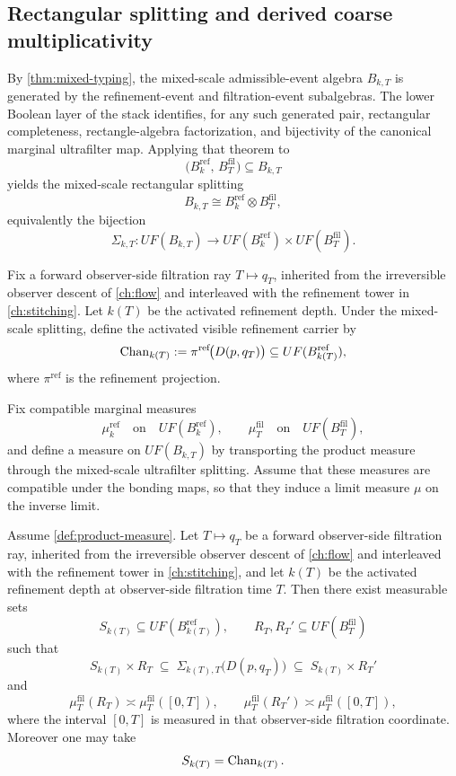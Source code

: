 \subsection{Rectangular splitting and derived coarse multiplicativity}
\label{subsec:derived-coarse}
By \cref{thm:mixed-typing}, the mixed-scale admissible-event algebra
\(B_{k,T}\) is generated by the refinement-event and filtration-event
subalgebras.  The lower Boolean layer of the stack identifies, for any
such generated pair, rectangular completeness, rectangle-algebra
factorization, and bijectivity of the canonical marginal ultrafilter
map.  Applying that theorem to
\[
	\bigl(B_k^{\mathrm{ref}},\,B_T^{\mathrm{fil}}\bigr)\subseteq B_{k,T}
\]
yields the mixed-scale rectangular splitting
\[
	B_{k,T}\cong B_k^{\mathrm{ref}}\otimes B_T^{\mathrm{fil}},
\]
equivalently the bijection
\[
	\Sigma_{k,T}:UF(B_{k,T})
	\longrightarrow
	UF(B_k^{\mathrm{ref}})\times UF(B_T^{\mathrm{fil}}).
\]
\begin{definition}
	Fix a forward observer-side filtration ray \(T\mapsto q_T\),
	inherited from the irreversible observer descent of \cref{ch:flow}
	and interleaved with the refinement tower in
	\cref{ch:stitching}.  Let \(k(T)\) be the activated refinement
	depth.  Under the mixed-scale splitting, define the activated
	visible refinement carrier by
	\[
		\operatorname{Chan}_{k(T)}
		:=
		\pi^{\mathrm{ref}}\!\bigl(D(p,q_T)\bigr)
		\subseteq UF(B_{k(T)}^{\mathrm{ref}}),
	\]
	where \(\pi^{\mathrm{ref}}\) is the refinement projection.
\end{definition}
\begin{definition}
	\label{def:product-measure}
	Fix compatible marginal measures
	\[
		\mu_k^{\mathrm{ref}}
		\quad\text{on}\quad UF(B_k^{\mathrm{ref}}),
		\qquad
		\mu_T^{\mathrm{fil}}
		\quad\text{on}\quad UF(B_T^{\mathrm{fil}}),
	\]
	and define a measure on \(UF(B_{k,T})\) by transporting the product
	measure through the mixed-scale ultrafilter splitting.  Assume that
	these measures are compatible under the bonding maps, so that they
	induce a limit measure \(\mu\) on the inverse limit.
\end{definition}
\begin{lemma}
	\label{lem:diamond-product}
	Assume \cref{def:product-measure}.  Let \(T\mapsto q_T\) be a
	forward observer-side filtration ray, inherited from the
	irreversible observer descent of \cref{ch:flow} and interleaved
	with the refinement tower in \cref{ch:stitching}, and let \(k(T)\)
	be the activated refinement depth at observer-side filtration time
	\(T\).
	Then there exist measurable sets
	\[
		S_{k(T)}\subseteq UF(B_{k(T)}^{\mathrm{ref}}),
		\qquad
		R_T,R_T'\subseteq UF(B_T^{\mathrm{fil}})
	\]
	such that
	\[
		S_{k(T)}\times R_T
		\;\subseteq\;
		\Sigma_{k(T),T}\bigl(D(p,q_T)\bigr)
		\;\subseteq\;
		S_{k(T)}\times R_T'
	\]
	and
	\[
		\mu_T^{\mathrm{fil}}(R_T)\asymp \mu_T^{\mathrm{fil}}([0,T]),
		\qquad
		\mu_T^{\mathrm{fil}}(R_T')\asymp \mu_T^{\mathrm{fil}}([0,T]),
	\]
	where the interval \([0,T]\) is measured in that observer-side
	filtration coordinate.
	Moreover one may take
	\[
		S_{k(T)}=\operatorname{Chan}_{k(T)}.
	\]
\end{lemma}
